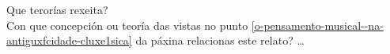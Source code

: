 \begin{ejercicio}[]
Que terorías rexeita?\dotfill \\
Con que concepción ou teoría das vistas no punto \ref{o-pensamento-musical--na-antiguxfcidade-cluxe1sica} da páxina \pageref{o-pensamento-musical--na-antiguxfcidade-cluxe1sica} relacionas este relato? \ldots
 \vspace*{0.50cm} %
\end{ejercicio}
%

